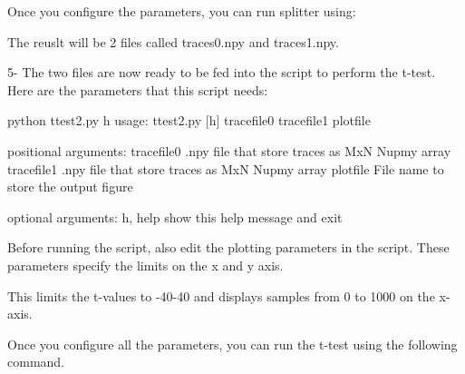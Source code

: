 \documentclass[letterpaper,10pt,english]{sphinxmanual}
\begin{document}
Once you configure the parameters, you can run splitter using:

\begin{sphinxVerbatim}[commandchars=\\\{\}]
 
\end{sphinxVerbatim}

The reuslt will be 2 files called traces0.npy and traces1.npy.

5- The two files are now ready to be fed into the  script to perform the t-test. Here are the parameters that this script needs:

\begin{sphinxVerbatim}[commandchars=\\\{\}]
\PYGZdl{} python t\PYGZhy{}test2.py \PYGZhy{}h
usage: t\PYGZhy{}test2.py [\PYGZhy{}h] trace\PYGZus{}file0 trace\PYGZus{}file1 plot\PYGZus{}file

positional arguments:
trace\PYGZus{}file0  .npy file that store traces as MxN Nupmy array
trace\PYGZus{}file1  .npy file that store traces as MxN Nupmy array
plot\PYGZus{}file    File name to store the output figure

optional arguments:
\PYGZhy{}h, \PYGZhy{}\PYGZhy{}help   show this help message and exit
\end{sphinxVerbatim}

Before running the script, also edit the plotting parameters in the script. These parameters specify the limits on the x and y axis.

\begin{sphinxVerbatim}[commandchars=\\\{\}]
  
  
  
  
\end{sphinxVerbatim}

This limits the t-values to -40-40 and displays samples from 0 to 1000 on the x-axis.

Once you configure all the parameters, you can run the t-test using the following command.
\end{document}
